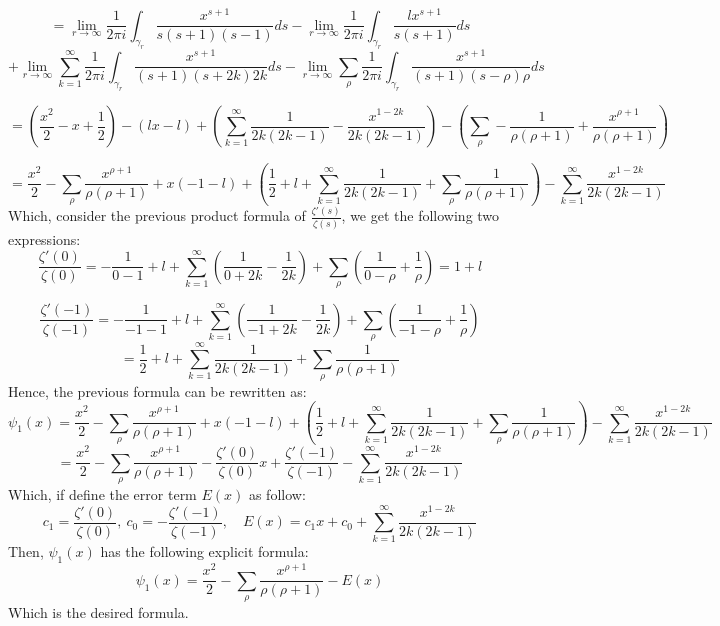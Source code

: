 \documentclass{article}
\begin{document}
\hfil

$$ = \lim_{r\rightarrow\infty}\frac{1}{2\pi i}\int_{\gamma_{r}}\frac{x^{s+1}}{s(s+1)(s-1)}ds-\lim_{r\rightarrow\infty}\frac{1}{2\pi i}\int_{\gamma_{r}}\frac{lx^{s+1}}{s(s+1)}ds$$
$$+ \lim_{r\rightarrow\infty}\sum_{k=1}^{\infty}\frac{1}{2\pi i}\int_{\gamma_{r}}\frac{x^{s+1}}{(s+1)(s+2k)2k}ds - \lim_{r\rightarrow\infty}\sum_{\rho}\frac{1}{2\pi i}\int_{\gamma_{r}}\frac{x^{s+1}}{(s+1)(s-\rho)\rho}ds$$

\hfil

$$ = \left(\frac{x^2}{2}-x+\frac{1}{2}\right) - \left(lx-l\right)+\left(\sum_{k=1}^{\infty}\frac{1}{2k(2k-1)}-\frac{x^{1-2k}}{2k(2k-1)}\right) - \left(\sum_{\rho}-\frac{1}{\rho(\rho+1)}+\frac{x^{\rho+1}}{\rho(\rho+1)}\right)$$

\hfil

$$= \frac{x^2}{2} - \sum_{\rho}\frac{x^{\rho+1}}{\rho(\rho+1)} + x\left(-1-l\right) + \left(\frac{1}{2}+l+\sum_{k=1}^{\infty}\frac{1}{2k(2k-1)}+\sum_{\rho}\frac{1}{\rho(\rho+1)}\right)-\sum_{k=1}^{\infty}\frac{x^{1-2k}}{2k(2k-1)}$$
Which, consider the previous product formula of $\frac{\zeta'(s)}{\zeta(s)}$, we get the following two expressions:
$$\frac{\zeta'(0)}{\zeta(0)} = -\frac{1}{0-1}+l+\sum_{k=1}^{\infty}\left(\frac{1}{0+2k}-\frac{1}{2k}\right) + \sum_{\rho}\left(\frac{1}{0-\rho}+\frac{1}{\rho}\right) = 1+l$$

$$\frac{\zeta'(-1)}{\zeta(-1)}=-\frac{1}{-1-1}+l+\sum_{k=1}^{\infty}\left(\frac{1}{-1+2k}-\frac{1}{2k}\right) + \sum_{\rho}\left(\frac{1}{-1-\rho}+\frac{1}{\rho}\right)$$
$$ = \frac{1}{2}+l + \sum_{k=1}^{\infty}\frac{1}{2k(2k-1)}+\sum_{\rho}\frac{1}{\rho(\rho+1)}$$
Hence, the previous formula can be rewritten as:
$$\psi_1(x)= \frac{x^2}{2} - \sum_{\rho}\frac{x^{\rho+1}}{\rho(\rho+1)} + x\left(-1-l\right) + \left(\frac{1}{2}+l+\sum_{k=1}^{\infty}\frac{1}{2k(2k-1)}+\sum_{\rho}\frac{1}{\rho(\rho+1)}\right)-\sum_{k=1}^{\infty}\frac{x^{1-2k}}{2k(2k-1)}$$
$$ = \frac{x^2}{2}-\sum_{\rho}\frac{x^{\rho+1}}{\rho(\rho+1)} - \frac{\zeta'(0)}{\zeta(0)}x + \frac{\zeta'(-1)}{\zeta(-1)} - \sum_{k=1}^{\infty}\frac{x^{1-2k}}{2k(2k-1)}$$
Which, if define the error term $E(x)$ as follow:
$$c_1=\frac{\zeta'(0)}{\zeta(0)},\ c_0=-\frac{\zeta'(-1)}{\zeta(-1)},\quad E(x)=c_1x+c_0+\sum_{k=1}^{\infty}\frac{x^{1-2k}}{2k(2k-1)}$$
Then, $\psi_1(x)$ has the following explicit formula:
$$\psi_1(x) = \frac{x^2}{2} - \sum_{\rho}\frac{x^{\rho+1}}{\rho(\rho+1)}-E(x)$$
Which is the desired formula.


\break
\end{document}
